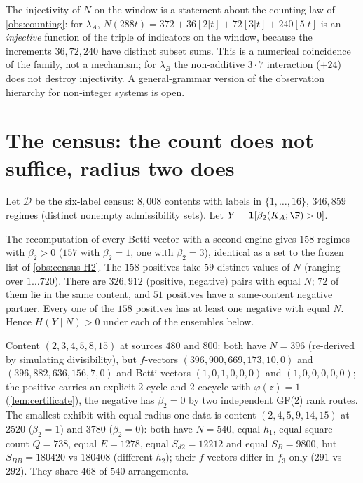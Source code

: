 \begin{remark}
The injectivity of $N$ on the window is a statement about the counting law of \cref{obs:counting}: for $\lambda_A$, $N(288t)=372+36[2|t]+72[3|t]+240[5|t]$ is an \emph{injective} function of the triple of indicators on the window, because the increments $36,72,240$ have distinct subset sums. This is a numerical coincidence of the family, not a mechanism; for $\lambda_B$ the non-additive $3\cdot7$ interaction ($+24$) does not destroy injectivity. A general-grammar version of the observation hierarchy for non-integer systems is open.
\end{remark}

\section{The census: the count does not suffice, radius two does}\label{sec:census-entropy}
Let $\mathcal D$ be the six-label census: $8{,}008$ contents with labels in $\{1,\dots,16\}$, $346{,}859$ regimes (distinct nonempty admissibility sets). Let $Y=\mathbf 1[\beta_2(K_A;\F)>0]$.
\begin{observation}\label{obs:equal-N}
The recomputation of every Betti vector with a second engine gives $158$ regimes with $\beta_2>0$ ($157$ with $\beta_2=1$, one with $\beta_2=3$), identical as a set to the frozen list of \cref{obs:census-H2}. The $158$ positives take $59$ distinct values of $N$ (ranging over $1\ldots720$). There are $326{,}912$ (positive, negative) pairs with equal $N$; $72$ of them lie in the same content, and $51$ positives have a same-content negative partner. Every one of the $158$ positives has at least one negative with equal $N$. Hence $H(Y\mid N)>0$ under each of the ensembles below.
\end{observation}
\begin{example}\label{ex:pair}
Content $(2,3,4,5,8,15)$ at sources $480$ and $800$: both have $N=396$ (re-derived by simulating divisibility), but $f$-vectors $(396,900,669,173,10,0)$ and $(396,882,636,156,7,0)$ and Betti vectors $(1,0,1,0,0,0)$ and $(1,0,0,0,0,0)$; the positive carries an explicit $2$-cycle and $2$-cocycle with $\varphi(z)=1$ (\cref{lem:certificate}), the negative has $\beta_2=0$ by two independent GF(2) rank routes. The smallest exhibit with equal radius-one data is content $(2,4,5,9,14,15)$ at $2520$ ($\beta_2=1$) and $3780$ ($\beta_2=0$): both have $N=540$, equal $h_1$, equal square count $Q=738$, equal $E=1278$, equal $S_{d2}=12212$ and equal $S_B=9800$, but $S_{BB}=180420$ vs $180408$ (different $h_2$); their $f$-vectors differ in $f_3$ only ($291$ vs $292$). They share $468$ of $540$ arrangements.
\end{example}
